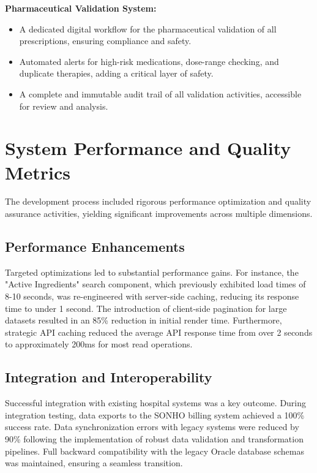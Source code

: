 \textbf{Pharmaceutical Validation System:}
\begin{itemize}
    \item A dedicated digital workflow for the pharmaceutical validation of all prescriptions, ensuring compliance and safety.
    \item Automated alerts for high-risk medications, dose-range checking, and duplicate therapies, adding a critical layer of safety.
    \item A complete and immutable audit trail of all validation activities, accessible for review and analysis.
\end{itemize}

\section{System Performance and Quality Metrics}

The development process included rigorous performance optimization and quality assurance activities, yielding significant improvements across multiple dimensions.

\subsection{Performance Enhancements}

Targeted optimizations led to substantial performance gains. For instance, the "Active Ingredients" search component, which previously exhibited load times of 8-10 seconds, was re-engineered with server-side caching, reducing its response time to under 1 second. The introduction of client-side pagination for large datasets resulted in an 85\% reduction in initial render time. Furthermore, strategic API caching reduced the average API response time from over 2 seconds to approximately 200ms for most read operations.

\subsection{Integration and Interoperability}

Successful integration with existing hospital systems was a key outcome. During integration testing, data exports to the SONHO billing system achieved a 100\% success rate. Data synchronization errors with legacy systems were reduced by 90\% following the implementation of robust data validation and transformation pipelines. Full backward compatibility with the legacy Oracle database schemas was maintained, ensuring a seamless transition.

